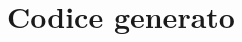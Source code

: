 \chapter{Codice generato}\label{cap:CodiceGenerato}
\rhead[]{\fancyplain{}{\footnotesize{\leftmark}}}
\lfoot[\fancyplain{}{\bf \thepage}]{}
\cfoot[]{} %
\rfoot[]{\fancyplain{}{\bf \thepage}}
